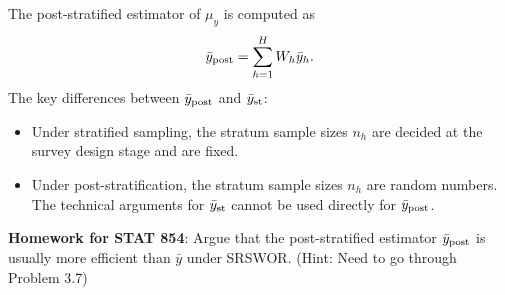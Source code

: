 The post-stratified estimator of $ \mu_y $ is computed as
\[ \bar{y}_{\text{post}}=\sum_{h=1}^{H}W_h\bar{y}_h. \]
The key differences between $ \bar{y}_{\text{post}} $ and $ \bar{y}_{\text{st}} $:
\begin{itemize}
      \item Under stratified sampling, the stratum sample sizes $ n_h $ are
            decided at the survey design stage and are fixed.
      \item Under post-stratification, the stratum sample sizes $ n_h $ are random
            numbers. The technical arguments for $ \bar{y}_{\text{st}} $ cannot be used directly
            for $ \bar{y}_{\text{post}} $.
\end{itemize}
\textbf{Homework for STAT 854}: Argue that the post-stratified estimator
$ \bar{y}_{\text{post}} $ is usually more efficient than $ \bar{y} $ under SRSWOR\@.
(Hint: Need to go through Problem 3.7)